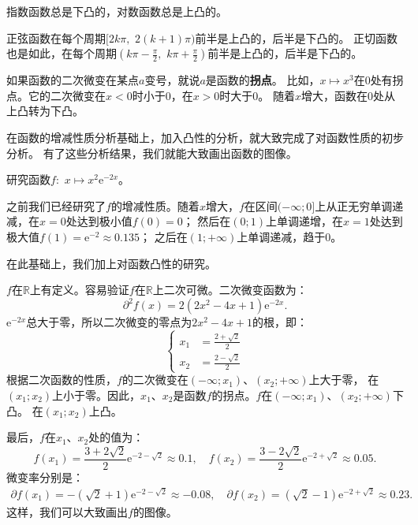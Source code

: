 \documentclass[12pt,UTF8]{ctexbook}
\begin{document}
指数函数总是下凸的，对数函数总是上凸的。

正弦函数在每个周期$[2k\pi, \,\, 2(k+1)\pi)$前半是上凸的，后半是下凸的。
正切函数也是如此，在每个周期$(k\pi-\frac{\pi}{2}, \,\, k\pi+\frac{\pi}{2})$前半是上凸的，后半是下凸的。

如果函数的二次微变在某点$a$变号，就说$a$是函数的\textbf{拐点}。
比如，$x\mapsto x^3$在$0$处有拐点。它的二次微变在$x<0$时小于$0$，在$x>0$时大于$0$。
随着$x$增大，函数在$0$处从上凸转为下凸。

在函数的增减性质分析基础上，加入凸性的分析，就大致完成了对函数性质的初步分析。
有了这些分析结果，我们就能大致画出函数的图像。

\begin{et}
    研究函数$f:\,\,x\mapsto x^2 \mathrm{e}^{-2x}$。
\end{et}

\begin{so}

    之前我们已经研究了$f$的增减性质。随着$x$增大，$f$在区间$(-\infty; 0]$上从正无穷单调递减，在$x = 0$处达到极小值$f(0) = 0$；
    然后在$(0; 1)$上单调递增，在$x = 1$处达到极大值$f(1) = \mathrm{e}^{-2} \approx 0.135$；
    之后在$(1; +\infty)$上单调递减，趋于$0$。

    在此基础上，我们加上对函数凸性的研究。

    $f$在$\mathbb{R}$上有定义。容易验证$f$在$\mathbb{R}$上二次可微。二次微变函数为：
    $$ \partial^2 f (x) = 2(2x^2 - 4x + 1)\mathrm{e}^{-2x}.$$
    $\mathrm{e}^{-2x}$总大于零，所以二次微变的零点为$2x^2 - 4x + 1$的根，即：
    $$  
        \left\{ 
            \begin{array}{cl}
                x_1 &= \frac{2 + \sqrt{2}}{2} \\
                x_2 &= \frac{2 - \sqrt{2}}{2} 
            \end{array}
        \right.
    $$
    根据二次函数的性质，$f$的二次微变在$(-\infty; x_1)$、$(x_2; +\infty)$上大于零，
    在$(x_1; x_2)$上小于零。因此，$x_1$、$x_2$是函数$f$的拐点。$f$在$(-\infty; x_1)$、$(x_2; +\infty)$下凸。
    在$(x_1; x_2)$上凸。

    最后，$f$在$x_1$、$x_2$处的值为：
    $$ f(x_1) = \frac{3 + 2\sqrt{2}}{2} \mathrm{e}^{-2-\sqrt{2}} \approx 0.1, \quad f(x_2) = \frac{3 - 2\sqrt{2}}{2} \mathrm{e}^{-2+\sqrt{2}} \approx 0.05. $$
    微变率分别是：
    \begin{align*}
        \partial f(x_1) = -(\sqrt{2} + 1)\mathrm{e}^{-2-\sqrt{2}} \approx -0.08, \quad  \partial f(x_2) = (\sqrt{2} - 1)\mathrm{e}^{-2+\sqrt{2}} \approx 0.23. 
    \end{align*}
    这样，我们可以大致画出$f$的图像。
\end{so}
\end{document}
